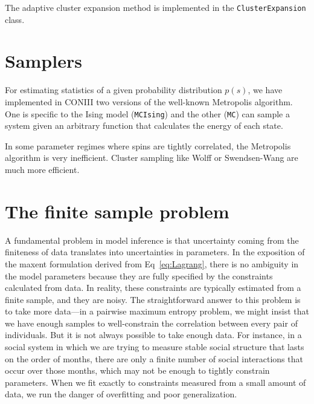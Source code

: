 \documentclass[aps,prl,twocolumn,nofootinbib]{revtex4-1}
\begin{document}
The adaptive cluster expansion method is implemented in the {\tt ClusterExpansion} class.






\section{Samplers}
For estimating statistics of a given probability distribution $p(s)$, we have implemented in CONIII two versions of the well-known Metropolis algorithm. One is specific to the Ising model ({\tt MCIsing}) and the other ({\tt MC}) can sample a system given an arbitrary function that calculates the energy of each state.

In some parameter regimes where spins are tightly correlated, the Metropolis algorithm is very inefficient. Cluster sampling like Wolff or Swendsen-Wang are much more efficient.

\section{The finite sample problem}
A fundamental problem in model inference is that uncertainty coming
from the finiteness of data translates into uncertainties in parameters.
In the exposition of the maxent formulation derived from Eq~\ref{eq:Lagrang}, there is no ambiguity in the model parameters because they are fully specified by the constraints calculated from data. In reality, these constraints are typically estimated from a finite sample, and they are noisy.
The straightforward answer to this problem is to take more data---in a pairwise
maximum entropy problem, we might insist that we have enough samples to well-constrain
the correlation between every pair of individuals.  But it is not always possible
to take enough data.  For instance, in a social system in which we are trying to
measure stable social structure that lasts on the order of months, there are only
a finite number of social interactions that occur over those months, which may
not be enough to tightly constrain parameters. When we fit exactly to constraints measured from a small amount of data, we run the danger of overfitting and poor generalization.
\end{document}
